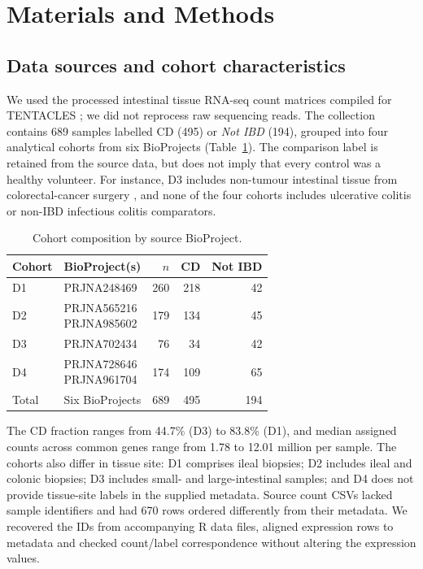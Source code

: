 \section{Materials and Methods}
\subsection{Data sources and cohort characteristics}
\label{sec:dataset}
We used the processed intestinal tissue RNA-seq count matrices compiled for TENTACLES \cite{montesi2026tentacles}; we did not reprocess raw sequencing reads. The collection contains 689 samples labelled CD (495) or \emph{Not IBD} (194), grouped into four analytical cohorts from six BioProjects (Table~\ref{tab:cohorts}). The comparison label is retained from the source data, but does not imply that every control was a healthy volunteer. For instance, D3 includes non-tumour intestinal tissue from colorectal-cancer surgery \cite{friedrich2021il1}, and none of the four cohorts includes ulcerative colitis or non-IBD infectious colitis comparators.

\begin{table}[!t]
\caption{Cohort composition by source BioProject.}
\label{tab:cohorts}
\centering\footnotesize
\setlength{\tabcolsep}{3.5pt}
\renewcommand{\arraystretch}{1.1}
\begin{tabular}{@{}llrrr@{}}
\toprule
Cohort & BioProject(s) & $n$ & CD & Not IBD\\
\midrule
D1 & PRJNA248469 & 260 & 218 & 42\\
D2 & \shortstack[l]{PRJNA565216\\PRJNA985602} & 179 & 134 & 45\\
D3 & PRJNA702434 & 76 & 34 & 42\\
D4 & \shortstack[l]{PRJNA728646\\PRJNA961704} & 174 & 109 & 65\\
\midrule
Total & Six BioProjects & 689 & 495 & 194\\
\bottomrule
\end{tabular}
\end{table}

The CD fraction ranges from 44.7\% (D3) to 83.8\% (D1), and median assigned counts across common genes range from 1.78 to 12.01 million per sample. The cohorts also differ in tissue site: D1 comprises ileal biopsies; D2 includes ileal and colonic biopsies; D3 includes small- and large-intestinal samples; and D4 does not provide tissue-site labels in the supplied metadata. Source count CSVs lacked sample identifiers and had 670 rows ordered differently from their metadata. We recovered the IDs from accompanying R data files, aligned expression rows to metadata and checked count/label correspondence without altering the expression values.


